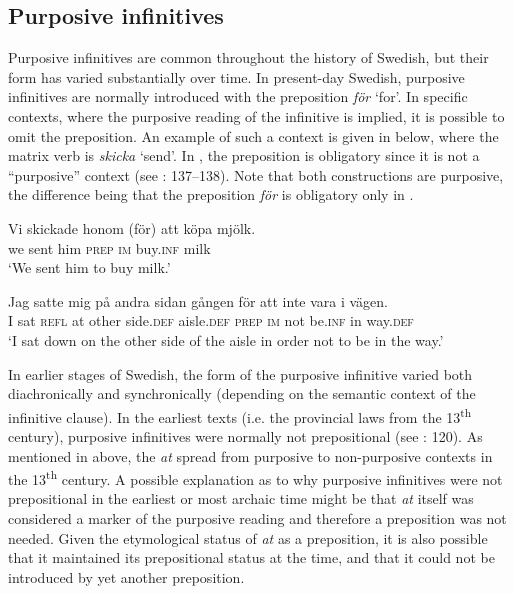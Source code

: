 \documentclass[output=paper]{langscibook}
\begin{document}
\subsection{Purposive infinitives}\label{sec:kalm:4.1}
Purposive infinitives are common throughout the history of Swedish, but their form has varied substantially over time. In present-day Swedish, purposive infinitives are normally introduced with the preposition \textit{för} ‘for’. In specific contexts, where the purposive reading of the infinitive is implied, it is possible to omit the preposition. An example of such a context is given in  below, where the matrix verb is \textit{skicka} ‘send’. In , the preposition is obligatory since it is not a “purposive” context (see \citealt{Kalm2016Satsekvivalenta}: 137–138). Note that both constructions are purposive, the difference being that the preposition \textit{för} is obligatory only in .


\ea {}\label{ex:kalm:8}
\ea \label{ex:kalm:8a}
\gll Vi skickade honom (för) att köpa mjölk.\\
we sent him \textsc{prep} \textsc{im} buy.\textsc{inf} milk\\
\glt ‘We sent him to buy milk.’

\ex  \label{ex:kalm:8b}
\gll Jag satte mig på andra sidan gången för att inte vara i vägen.\\
 I sat \textsc{refl} at other side.\textsc{def} aisle.\textsc{def} \textsc{prep} \textsc{im} not be.\textsc{inf} in way.\textsc{def}\\
\glt ‘I sat down on the other side of the aisle in order not to be in the way.’
\z 
\z 


In earlier stages of Swedish, the form of the purposive infinitive varied both diachronically and synchronically (depending on the semantic context of the infinitive clause). In the earliest  texts (i.e. the provincial laws from the 13\textsuperscript{th} century), purposive infinitives were normally not prepositional (see \citealt{Kalm2016Satsekvivalenta}: 120). As mentioned in  above, the  \textit{at} spread from purposive to non-purposive contexts in the 13\textsuperscript{th} century. A possible explanation as to why purposive infinitives were not prepositional in the earliest or most archaic time might be that \textit{at} itself was considered a marker of the purposive reading and therefore a preposition was not needed. Given the etymological status of \textit{at} as a preposition, it is also possible that it maintained its prepositional status at the time, and that it could not be introduced by yet another preposition. 
\end{document}
